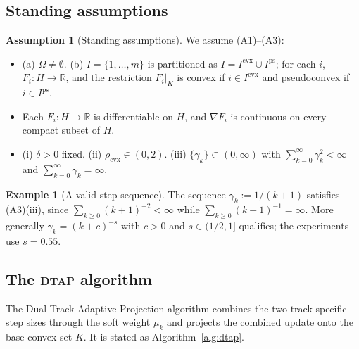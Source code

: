 \documentclass[]{interact}
\theoremstyle{plain}
\theoremstyle{definition}
\newtheorem{example}[theorem]{Example}
\newtheorem{assumption}{Assumption}
\theoremstyle{remark}
\newcommand{\R}{\mathbb{R}}
\newcommand{\cvx}{\mathrm{cvx}}
\newcommand{\ps}{\mathrm{ps}}
\begin{document}
\subsection{Standing assumptions}\label{ssec:assumptions}
\begin{assumption}[Standing assumptions]\label{ass:standing}
We assume \textup{(A1)--(A3)}:
\begin{itemize}[leftmargin=2.4em,itemsep=2pt]
\item[\textup{(A1)}] \textup{(a)} $\Omega\ne\emptyset$. \textup{(b)} $I=\{1,\dots,m\}$
is partitioned as $I=I^{\cvx}\cup I^{\ps}$; for each $i$, $F_i:H\to\R$, and the
restriction $F_i|_K$ is convex if $i\in I^{\cvx}$ and pseudoconvex if $i\in I^{\ps}$.
\item[\textup{(A2)}] Each $F_i:H\to\R$ is differentiable on $H$, and $\nabla F_i$ is
continuous on every compact subset of $H$.
\item[\textup{(A3)}] \textup{(i)} $\delta>0$ fixed. \textup{(ii)}
$\rho_{\cvx}\in(0,2)$. \textup{(iii)} $\{\gamma_k\}\subset(0,\infty)$ with
$\sum_{k=0}^\infty\gamma_k^2<\infty$ and $\sum_{k=0}^\infty\gamma_k=\infty$.
\end{itemize}
\end{assumption}
\begin{example}[A valid step sequence]\label{ex:gamma}
The sequence $\gamma_k:=1/(k+1)$ satisfies (A3)(iii), since $\sum_{k\ge0}(k+1)^{-2}<\infty$
while $\sum_{k\ge0}(k+1)^{-1}=\infty$. More generally $\gamma_k=(k+c)^{-s}$ with $c>0$
and $s\in(1/2,1]$ qualifies; the experiments use $s=0.55$.
\end{example}

\subsection{The \textsc{dtap} algorithm}\label{ssec:algorithm}
The Dual-Track Adaptive Projection algorithm combines the two track-specific step sizes
through the soft weight $\mu_k$ and projects the combined update onto the base convex
set $K$. It is stated as Algorithm~\ref{alg:dtap}.
\end{document}
